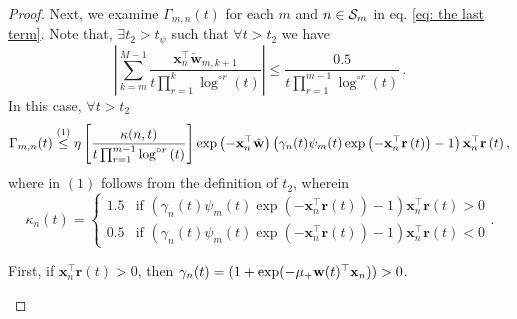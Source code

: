 \documentclass[twoside,11pt,english]{article}
\begin{document}
\begin{proof}

Next, we examine $\Gamma_{m,n}(t)$ for each $m$ and $n\in\mathcal{S}_{m}$ in eq.
\ref{eq: the last term}. Note that, $\exists t_{2}>t_{\psi}$ such that $\forall t>t_{2}$ we have \[\left|\sum_{k=m}^{M-1}\frac{\mathbf{x}_{n}^{\top}\check{\mathbf{w}}_{m,k+1}}{t\prod_{r=1}^{k}\log^{\circ r}\left(t\right)}\right|\le \frac{0.5}{t\prod_{r=1}^{m-1}\log^{\circ r}\left(t\right)}\, . \]
In this case, $\forall t>t_2$
\begin{align}
 \Gamma_{m,n}(t)
\overset{\left(1\right)}{\leq} \eta\left[\frac{\kappa(n,t)}{t\prod_{r=1}^{m-1}\log^{\circ r}\left(t\right)}\right]\exp\left(-\mathbf{x}_{n}^{\top}\tilde{\mathbf{w}}\right)\left(\gamma_n(t)\psi_m(t)\exp\left(-\mathbf{x}_{n}^{\top}\mathbf{r}\left(t\right)\right)-1\right)\mathbf{x}_{n}^{\top}\mathbf{r}\left(t\right),
\label{eq:case1}
\end{align}
where in $\left(1\right)$ follows from the definition of 
$t_{2}$, wherein \[\kappa_n(t)=\left\{\begin{array}{ll}
1.5&\text{if }\left(\gamma_n(t)\psi_m(t)\exp\left(-\mathbf{x}_{n}^{\top}\mathbf{r}\left(t\right)\right)-1\right)\mathbf{x}_{n}^{\top}\mathbf{r}\left(t\right)>0\\
0.5 & \text{if }\left(\gamma_n(t)\psi_m(t)\exp\left(-\mathbf{x}_{n}^{\top}\mathbf{r}\left(t\right)\right)-1\right)\mathbf{x}_{n}^{\top}\mathbf{r}\left(t\right)<0
\end{array}\right..\]

\begin{asparaenum}
\item First, if $\mathbf{x}_{n}^{\top}\mathbf{r}\left(t\right)>0$, then $\gamma_n(t)=(1+\exp(-\mu_+\mathbf{w}(t)^\top\mathbf{x}_{n}))>0$. 


\end{asparaenum}
\end{proof}
\end{document}
